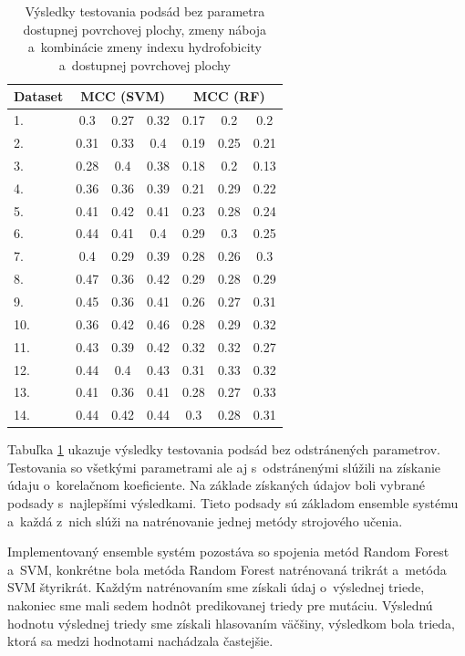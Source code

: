 \begin{table}[H]
	\centering
	\begin{tabular}{|l |c |c |c |c |c |c|}
	\hline
	Dataset & \multicolumn{3}{c|}{MCC (SVM)} & \multicolumn{3}{c|}{MCC (RF)} \\ \cline{1-7}
	\hline 
	1. & 0.3 & 0.27 & 0.32 & 0.17 & 0.2 & 0.2 \\ \cline{1-7} 
	2. & 0.31 & 0.33 & 0.4 & 0.19 & 0.25 & 0.21\\ \cline{1-7} 
	3. & 0.28 & 0.4 & 0.38 & 0.18 & 0.2 & 0.13 \\ \cline{1-7}
	4. & 0.36 & 0.36 & 0.39 & 0.21 & 0.29 & 0.22 \\ \cline{1-7}
	5. & 0.41 & 0.42 & 0.41 & 0.23 & 0.28 & 0.24\\ \cline{1-7}
	6. & 0.44 & 0.41 & 0.4 & 0.29 & 0.3 & 0.25\\ \cline{1-7}
	7. & 0.4 & 0.29 & 0.39 & 0.28 & 0.26 & 0.3\\ \cline{1-7}
	8. & 0.47 & 0.36 & 0.42 & 0.29 & 0.28 & 0.29\\ \cline{1-7}
	9. & 0.45 & 0.36 & 0.41 & 0.26 & 0.27 & 0.31\\ \cline{1-7}
	10.& 0.36 & 0.42 & 0.46 & 0.28 & 0.29 & 0.32\\ \cline{1-7}
	11.& 0.43 & 0.39 & 0.42 & 0.32 & 0.32 & 0.27\\ \cline{1-7}
	12.& 0.44 & 0.4 & 0.43  & 0.31 & 0.33 & 0.32\\ \cline{1-7}
	13.& 0.41 & 0.36  & 0.41 & 0.28 & 0.27 & 0.33\\ \cline{1-7}
	14.& 0.44 & 0.42 & 0.44 & 0.3 & 0.28 &  0.31\\ \cline{1-7}
	\hline
	\end{tabular}
\caption {Výsledky testovania podsád bez parametra dostupnej povrchovej plochy, zmeny náboja a~kombinácie zmeny indexu hydrofobicity a~dostupnej povrchovej plochy} 
\label{pythontest1} 
\end{table}


Tabuľka \ref{pythontest1} ukazuje výsledky testovania podsád bez odstránených parametrov. Testovania so všetkými parametrami ale aj s~odstránenými slúžili na získanie údaju o~korelačnom koeficiente. Na základe získaných údajov boli vybrané podsady s~najlepšími výsledkami. Tieto podsady sú základom ensemble systému a~každá z~nich slúži na natrénovanie jednej metódy strojového učenia.

Implementovaný ensemble systém pozostáva so spojenia metód Random Forest a~SVM, konkrétne bola metóda Random Forest natrénovaná trikrát a~metóda SVM štyrikrát. Každým natrénovaním sme získali údaj o~výslednej triede, nakoniec sme mali sedem hodnôt predikovanej triedy pre mutáciu. Výslednú hodnotu výslednej triedy sme získali hlasovaním väčšiny, výsledkom bola trieda, ktorá sa medzi hodnotami nachádzala častejšie.


